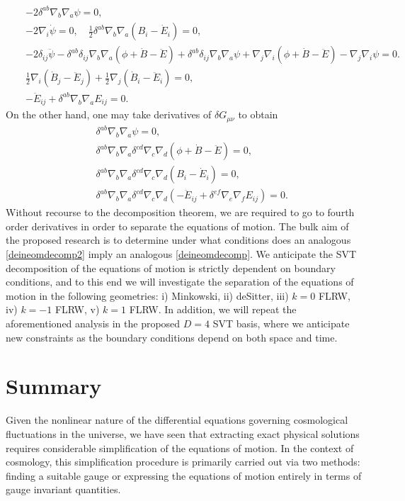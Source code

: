 \documentclass[10pt,letterpaper]{article}
\numberwithin{equation}{section}
\begin{document}
\begin{eqnarray}
&&- 2 \delta^{ab} {\nabla}_{b}{\nabla}_{a}\psi=0,
\nonumber\\
&&- 2 {\nabla}_{i}\dot{\psi}=0,\quad \tfrac{1}{2} \delta^{ab} {\nabla}_{b}{\nabla}_{a}(B_{i} -  \dot{E}_{i})=0,
\nonumber\\
&& -2 \delta_{ij} \ddot{\psi} -  \delta^{ab} \delta_{ij} {\nabla}_{b}{\nabla}_{a}(\phi+\dot{B}  -\ddot{E})+ \delta^{ab} \delta_{ij} {\nabla}_{b}{\nabla}_{a}\psi +{\nabla}_{j}{\nabla}_{i}(\phi+\dot{B} -  \ddot{E})  -  {\nabla}_{j}{\nabla}_{i}\psi=0.
\nonumber\\
&& \tfrac{1}{2} {\nabla}_{i}(\dot{B}_{j} - \ddot{E}_{j}) + \tfrac{1}{2} {\nabla}_{j}(\dot{B}_{i} 
- \ddot{E}_{i})=0,
\nonumber\\
&&- \ddot{E}_{ij} + \delta^{ab} {\nabla}_{b}{\nabla}_{a}E_{ij}=0. 
\label{deineomdecomp}
\end{eqnarray}
On the other hand, one may take derivatives of $\delta G_{\mu\nu}$ to obtain 
\begin{eqnarray}
&&\delta^{ab} {\nabla}_{b}{\nabla}_{a}\psi=0,
\nonumber\\
&&\delta^{ab} {\nabla}_{b}{\nabla}_{a} \delta^{cd} {\nabla}_{c}{\nabla}_{d}(\phi+\dot{B}  -\ddot{E})=0,
\nonumber\\
&&\delta^{ab} {\nabla}_{b}{\nabla}_{a} \delta^{cd} {\nabla}_{c}{\nabla}_{d}(B_i-\dot{E}_i)=0,
\nonumber\\
&&\delta^{ab} {\nabla}_{b}{\nabla}_{a} \delta^{cd} {\nabla}_{c}{\nabla}_{d}(-\ddot{E}_{ij}+\delta^{ef} {\nabla}_{e}{\nabla}_{f}E_{ij})=0. 
\label{deineomdecomp2}
\end{eqnarray}
Without recourse to the decomposition theorem, we are required to go to fourth order derivatives in order to separate the equations of motion. The bulk aim of the proposed research is to determine under what conditions does an analogous \eqref{deineomdecomp2} imply an analogous \eqref{deineomdecomp}. We anticipate the SVT decomposition of the equations of motion is strictly dependent on boundary conditions, and to this end we will investigate the separation of the equations of motion in the following geometries: i) Minkowski, ii) deSitter, iii) $k=0$ FLRW, iv) $k=-1$ FLRW, v) $k=1$ FLRW. In addition, we will repeat the aforementioned analysis in the proposed $D=4$ SVT basis, where we anticipate new constraints as the boundary conditions depend on both space and time. 
\newpage
%
\section*{Summary}
\label{sec:Summary}
\indent Given the nonlinear nature of the differential equations governing cosmological fluctuations in the universe, we have seen that extracting exact physical solutions requires considerable simplification of the equations of motion. In the context of cosmology, this simplification procedure is primarily carried out via two methods: finding a suitable gauge or expressing the equations of motion entirely in terms of gauge invariant quantities. 
\end{document}
